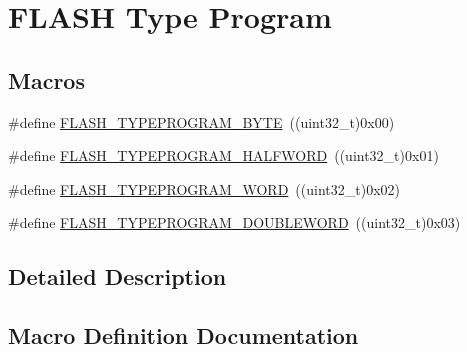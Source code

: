 \hypertarget{group___f_l_a_s_h___type___program}{}\section{F\+L\+A\+SH Type Program}
\label{group___f_l_a_s_h___type___program}
\subsection*{Macros}
\begin{DoxyCompactItemize}
\item 
\#define \hyperlink{group___f_l_a_s_h___type___program_gac975d7139325057ed0069c6b55e4faed}{F\+L\+A\+S\+H\+\_\+\+T\+Y\+P\+E\+P\+R\+O\+G\+R\+A\+M\+\_\+\+B\+Y\+TE}~((uint32\+\_\+t)0x00)
\item 
\#define \hyperlink{group___f_l_a_s_h___type___program_ga2b607dfc2efd463a8530e327bc755582}{F\+L\+A\+S\+H\+\_\+\+T\+Y\+P\+E\+P\+R\+O\+G\+R\+A\+M\+\_\+\+H\+A\+L\+F\+W\+O\+RD}~((uint32\+\_\+t)0x01)
\item 
\#define \hyperlink{group___f_l_a_s_h___type___program_gadd25c6821539030ba6711e7c0d586c3e}{F\+L\+A\+S\+H\+\_\+\+T\+Y\+P\+E\+P\+R\+O\+G\+R\+A\+M\+\_\+\+W\+O\+RD}~((uint32\+\_\+t)0x02)
\item 
\#define \hyperlink{group___f_l_a_s_h___type___program_gabdc2b0b4d2e66c2be90fafbfbf1e225f}{F\+L\+A\+S\+H\+\_\+\+T\+Y\+P\+E\+P\+R\+O\+G\+R\+A\+M\+\_\+\+D\+O\+U\+B\+L\+E\+W\+O\+RD}~((uint32\+\_\+t)0x03)
\end{DoxyCompactItemize}


\subsection{Detailed Description}


\subsection{Macro Definition Documentation}
